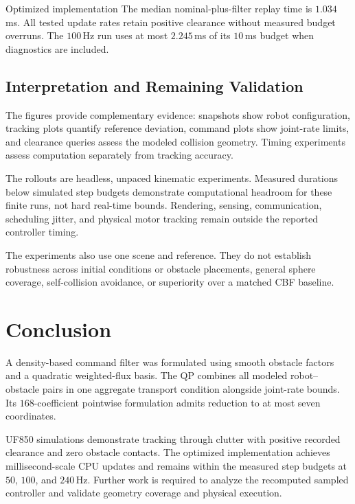 \documentclass[conference]{IEEEtran}
\begin{document}
\begin{resultbox}{Optimized implementation}
The median nominal-plus-filter replay time is
$1.034$\,ms. All tested update rates retain positive
clearance without measured budget overruns.
The $100$\,Hz run uses at most $2.245$\,ms
of its $10$\,ms budget when diagnostics are included.
\end{resultbox}

\subsection{Interpretation and Remaining Validation}

The figures provide complementary evidence:
snapshots show robot configuration, tracking plots
quantify reference deviation, command plots show
joint-rate limits, and clearance queries assess
the modeled collision geometry.
Timing experiments assess computation separately
from tracking accuracy.

The rollouts are headless, unpaced kinematic
experiments. Measured durations below simulated
step budgets demonstrate computational headroom
for these finite runs, not hard real-time bounds.
Rendering, sensing, communication, scheduling
jitter, and physical motor tracking remain
outside the reported controller timing.

The experiments also use one scene and reference.
They do not establish robustness across initial
conditions or obstacle placements, general
sphere coverage, self-collision avoidance,
or superiority over a matched CBF baseline.

\FloatBarrier

\section{Conclusion}
\label{sec:conclusion}

A density-based command filter was formulated
using smooth obstacle factors and a quadratic
weighted-flux basis.
The QP combines all modeled robot--obstacle pairs
in one aggregate transport condition alongside
joint-rate bounds.
Its $168$-coefficient pointwise formulation
admits reduction to at most seven coordinates.

UF850 simulations demonstrate tracking through
clutter with positive recorded clearance and
zero obstacle contacts.
The optimized implementation achieves
millisecond-scale CPU updates and remains
within the measured step budgets at $50$,
$100$, and $240$\,Hz.
Further work is required to analyze the
recomputed sampled controller and validate
geometry coverage and physical execution.
\end{document}

